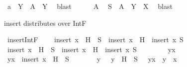 \begin{isabellebody}
\ {\isachardoublequoteopen}a\ {\isasyminter}\ Y\ {\isasymin}\ A\ {\isasyminter}{\isacharasterisk}{\kern0pt}\ Y{\isachardoublequoteclose}\ \isamarkupfalse%
\ blast\isanewline
\ \ \ \ \isamarkupfalse%
\ A{}\ \isamarkupfalse%
\ {\isachardoublequoteopen}S\ {\isasymin}\ {\isacharparenleft}{\kern0pt}A\ {\isasyminter}{\isacharasterisk}{\kern0pt}\ Y{\isacharparenright}{\kern0pt}\ {\isasyminter}{\isacharasterisk}{\kern0pt}\ X{\isachardoublequoteclose}\ \isamarkupfalse%
\ blast\isanewline
\ \ \isamarkupfalse%
\isanewline
{}\isamarkupfalse%
%
\endisatagproof
{\isafoldproof}%
%
\isadelimproof
%
\endisadelimproof
%
\begin{isamarkuptext}%
insert distributes over IntF%
\end{isamarkuptext}\isamarkuptrue%
\isamarkupfalse%
\ insert{\isacharunderscore}{\kern0pt}IntF{\isacharcolon}{\kern0pt}\ \isanewline
\ \ \ {\isachardoublequoteopen}insert\ x\ {\isacharbackquote}{\kern0pt}\ {\isacharparenleft}{\kern0pt}H\ {\isasyminter}{\isacharasterisk}{\kern0pt}\ S{\isacharparenright}{\kern0pt}\ {\isacharequal}{\kern0pt}\ {\isacharparenleft}{\kern0pt}insert\ x\ {\isacharbackquote}{\kern0pt}\ H{\isacharparenright}{\kern0pt}\ {\isasyminter}{\isacharasterisk}{\kern0pt}\ {\isacharparenleft}{\kern0pt}insert\ x\ S{\isacharparenright}{\kern0pt}{\isachardoublequoteclose}\isanewline
%
\isadelimproof
%
\endisadelimproof
%
\isatagproof
{}\isamarkupfalse%
\isanewline
\ \ \isamarkupfalse%
\ {\isachardoublequoteopen}insert\ x\ {\isacharbackquote}{\kern0pt}\ {\isacharparenleft}{\kern0pt}H\ {\isasyminter}{\isacharasterisk}{\kern0pt}\ S{\isacharparenright}{\kern0pt}\ {\isasymsubseteq}\ {\isacharparenleft}{\kern0pt}insert\ x\ {\isacharbackquote}{\kern0pt}\ H{\isacharparenright}{\kern0pt}\ {\isasyminter}{\isacharasterisk}{\kern0pt}\ {\isacharparenleft}{\kern0pt}insert\ x\ S{\isacharparenright}{\kern0pt}{\isachardoublequoteclose}\isanewline
\ \ \isamarkupfalse%
\isanewline
\ \ \ \ \isamarkupfalse%
\ y{\isacharunderscore}{\kern0pt}x\isanewline
\ \ \ \ \isamarkupfalse%
\ {\isachardoublequoteopen}y{\isacharunderscore}{\kern0pt}x\ {\isasymin}\ insert\ x\ {\isacharbackquote}{\kern0pt}\ {\isacharparenleft}{\kern0pt}H\ {\isasyminter}{\isacharasterisk}{\kern0pt}\ S{\isacharparenright}{\kern0pt}{\isachardoublequoteclose}\isanewline
\ \ \ \ \isamarkupfalse%
\ \isamarkupfalse%
\ y\ \ {}{\isacharcolon}{\kern0pt}\ {\isachardoublequoteopen}y\ {\isasymin}\ {\isacharparenleft}{\kern0pt}H\ {\isasyminter}{\isacharasterisk}{\kern0pt}\ S{\isacharparenright}{\kern0pt}{\isachardoublequoteclose}\ \ {}{\isacharcolon}{\kern0pt}\ {\isachardoublequoteopen}y{\isacharunderscore}{\kern0pt}x\ {\isacharequal}{\kern0pt}\ y\ {\isasymunion}\ {\isacharbraceleft}{\kern0pt}x{\isacharbraceright}{\kern0pt}{\isachardoublequoteclose}\ \isamarkupfalse%

\end{isabellebody}
